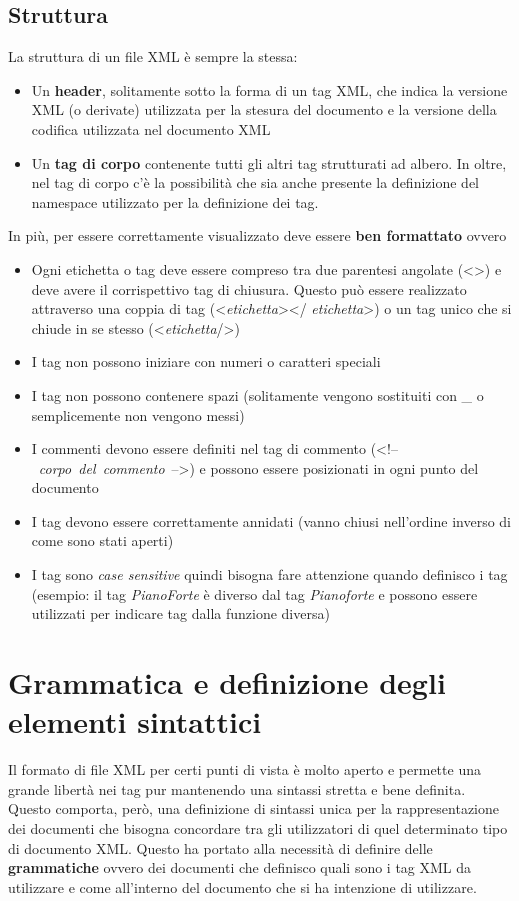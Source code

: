 \documentclass{report}
\begin{document}
\subsection{Struttura}
La struttura di un file XML è sempre la stessa:
\begin{itemize}
\item Un \textbf{header}, solitamente sotto la forma di un tag XML,  che indica la versione XML (o derivate) utilizzata per la stesura del documento e la versione della codifica utilizzata nel documento XML
\item Un \textbf{tag di corpo} contenente tutti gli altri tag strutturati ad albero. In oltre, nel tag di corpo c'è la possibilità che sia anche presente la definizione del namespace utilizzato per la definizione dei tag.
\end{itemize}
In più, per essere correttamente visualizzato deve essere \textbf{ben formattato} ovvero
\begin{itemize}
\item Ogni etichetta o tag deve essere compreso tra due parentesi angolate (<>) e deve avere il corrispettivo tag di chiusura. Questo può essere realizzato attraverso una coppia di tag (<\textit{etichetta}></ \textit{etichetta}>) o un tag unico che si chiude in se stesso (<\textit{etichetta}/>)
\item I tag non possono iniziare con numeri o caratteri speciali
\item I tag non possono contenere spazi (solitamente vengono sostituiti con \_ o semplicemente non vengono messi)
\item I commenti devono essere definiti nel tag di commento (<!--~\textit{corpo~del~commento}~-->) e possono essere posizionati in ogni punto del documento
\item I tag devono essere correttamente annidati (vanno chiusi nell'ordine inverso di come sono stati aperti)
\item I tag sono \textit{case sensitive} quindi bisogna fare attenzione quando definisco i tag (esempio: il tag \textit{PianoForte} è diverso dal tag \textit{Pianoforte} e possono essere utilizzati per indicare tag dalla funzione diversa)
\end{itemize}

\section{Grammatica e definizione degli elementi sintattici}
Il formato di file XML per certi punti di vista è molto aperto e permette una grande libertà nei tag pur mantenendo una sintassi stretta e bene definita.
Questo comporta, però, una definizione di sintassi unica per la rappresentazione dei documenti che bisogna concordare tra gli utilizzatori di quel determinato tipo di documento XML. Questo ha portato alla necessità di definire delle \textbf{grammatiche} ovvero dei documenti che definisco quali sono i tag XML da utilizzare e come all'interno del documento che si ha intenzione di utilizzare.
\end{document}
